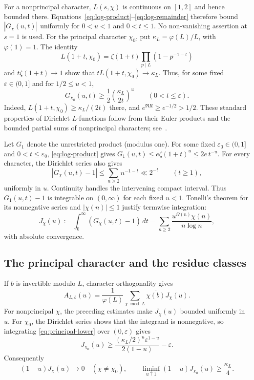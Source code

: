 \documentclass[11pt,reqno]{amsart}
\theoremstyle{definition}
\theoremstyle{remark}
\numberwithin{equation}{section}
\newcommand{\Om}{\Omega}
\begin{document}
For a nonprincipal character, $L(s,\chi)$ is continuous on $[1,2]$
and hence bounded there. Equations~\eqref{eq:log-product}--\eqref{eq:log-remainder}
therefore bound $|G_\chi(u,t)|$ uniformly for $0<u<1$ and $0<t\leq1$.
No non-vanishing assertion at $s=1$ is used. For the principal character
$\chi_0$, put $\kappa_L=\varphi(L)/L$, with $\varphi(1)=1$.
The identity
\[
 L(1+t,\chi_0)=\zeta(1+t)\prod_{p\mid L}(1-p^{-1-t})
\]
and $t\zeta(1+t)\to1$ show that
$tL(1+t,\chi_0)\to\kappa_L$. Thus, for some fixed
$\varepsilon\in(0,1]$ and for $1/2\leq u<1$,
\begin{equation}\label{eq:principal-lower}
 G_{\chi_0}(u,t)\geq\frac12
       \left(\frac{\kappa_L}{2t}\right)^u
       \qquad(0<t\leq\varepsilon).
\end{equation}
Indeed, $L(1+t,\chi_0)\geq\kappa_L/(2t)$ there, and
$e^{\Re R}\geq e^{-1/2}>1/2$.
These standard properties of Dirichlet $L$-functions follow from their
Euler products and the bounded partial sums of nonprincipal characters;
see~\cite[Sections~2 and~6]{Tao2014}.

Let $G_1$ denote the unrestricted product (modulus one).
For some fixed $\varepsilon_0\in(0,1]$ and $0<t\leq\varepsilon_0$,
\eqref{eq:log-product} gives
$G_1(u,t)\leq e\zeta(1+t)^u\leq2e\,t^{-u}$.
For every character, the Dirichlet series also gives
\[
 |G_\chi(u,t)-1|\leq\sum_{n\geq2}n^{-1-t}\ll2^{-t}
       \qquad(t\geq1),
\]
uniformly in $u$. Continuity handles the intervening compact interval.
Thus $G_1(u,t)-1$ is integrable on $(0,\infty)$ for each fixed $u<1$.
Tonelli's theorem for its nonnegative series and
$|\chi(n)|\leq1$ justify termwise integration:
\begin{equation}\label{eq:weighted-integral}
 J_\chi(u):=\int_0^\infty(G_\chi(u,t)-1)\,dt
      =\sum_{n\geq2}\frac{u^{\Om(n)}\chi(n)}{n\log n},
\end{equation}
with absolute convergence.

\subsection{The principal character and the residue classes}
If $b$ is invertible modulo $L$, character orthogonality gives
\[
 A_{L,b}(u)=\frac1{\varphi(L)}
       \sum_{\chi\bmod L}\overline{\chi(b)}J_\chi(u).
\]
For nonprincipal $\chi$, the preceding estimates make $J_\chi(u)$
bounded uniformly in $u$. For $\chi_0$, the Dirichlet series shows that
the integrand is nonnegative, so integrating
\eqref{eq:principal-lower} over $(0,\varepsilon)$ gives
\[
 J_{\chi_0}(u)\geq
 \frac{(\kappa_L/2)^u\varepsilon^{1-u}}{2(1-u)}-\varepsilon.
\]
Consequently
\begin{equation}\label{eq:character-limits}
 (1-u)J_\chi(u)\to0\quad(\chi\ne\chi_0),\qquad
 \liminf_{u\uparrow1}(1-u)J_{\chi_0}(u)\geq\frac{\kappa_L}{4}.
\end{equation}
\end{document}

